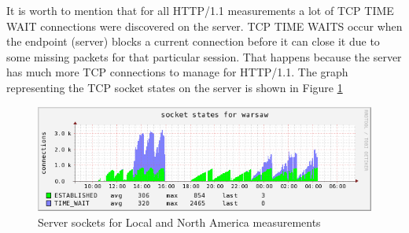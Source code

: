 It is worth to mention that for all HTTP/1.1 measurements a lot of TCP TIME WAIT connections were discovered on the server. TCP TIME WAITS occur when the endpoint (server) blocks a current connection before it can close it due to some missing packets for that particular session. That happens because the server has much more TCP connections to manage for HTTP/1.1. The graph representing the TCP socket states on the server is shown in Figure \ref{fig:sockets}

\begin{figure}[H]
\centering
\includegraphics[scale=0.6,trim=0.0cm .0cm .0cm .0cm,clip]{images/sockets.png}
\caption{Server sockets for Local and North America measurements}
\label{fig:sockets}
\end{figure}